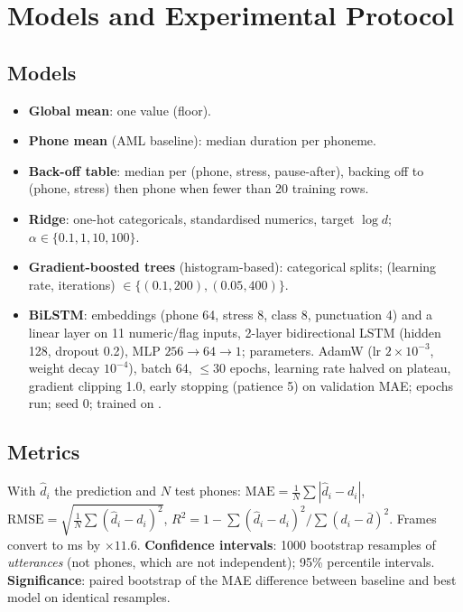 \documentclass[conference]{IEEEtran}
\begin{document}
\section{Models and Experimental Protocol}\label{sec:models}
\subsection{Models}
\begin{itemize}
\item \textbf{Global mean}: one value (floor).
\item \textbf{Phone mean} (AML baseline): median duration per phoneme.
\item \textbf{Back-off table}: median per (phone, stress, pause-after), backing off to (phone, stress) then phone when fewer than 20 training rows.
\item \textbf{Ridge}: one-hot categoricals, standardised numerics, target $\log d$; $\alpha\in\{0.1,1,10,100\}$.
\item \textbf{Gradient-boosted trees} (histogram-based): categorical splits; (learning rate, iterations) $\in\{(0.1,200),(0.05,400)\}$.
\item \textbf{BiLSTM}: embeddings (phone 64, stress 8, class 8, punctuation 4) and a linear layer on 11 numeric/flag inputs, 2-layer bidirectional LSTM (hidden 128, dropout 0.2), MLP $256\!\to\!64\!\to\!1$; \nnParams{} parameters. AdamW (lr $2\!\times\!10^{-3}$, weight decay $10^{-4}$), batch 64, $\le$30 epochs, learning rate halved on plateau, gradient clipping 1.0, early stopping (patience 5) on validation MAE; \nnEpochs{} epochs run; seed 0; trained on \gpuName{}.
\end{itemize}

\subsection{Metrics}
With $\hat d_i$ the prediction and $N$ test phones: $\mathrm{MAE}=\frac1N\sum|\hat d_i-d_i|$, $\mathrm{RMSE}=\sqrt{\frac1N\sum(\hat d_i-d_i)^2}$, $R^2=1-\sum(\hat d_i-d_i)^2/\sum(d_i-\bar d)^2$. Frames convert to ms by $\times11.6$.
\textbf{Confidence intervals}: 1000 bootstrap resamples of \emph{utterances} (not phones, which are not independent); 95\% percentile intervals. \textbf{Significance}: paired bootstrap of the MAE difference between baseline and best model on identical resamples.

\end{document}
